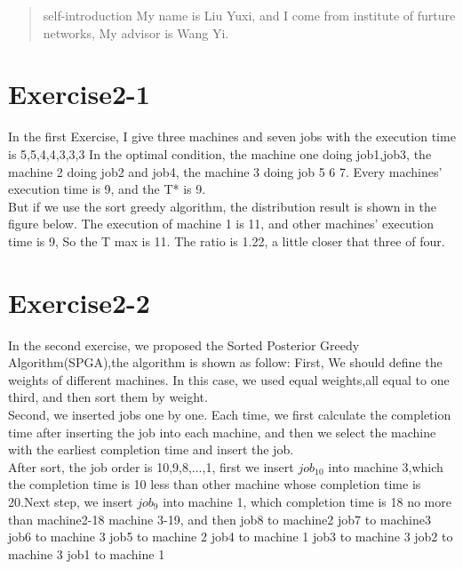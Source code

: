 \documentclass[]{article}
\title{}
\author{}
\begin{document}
\maketitle

\begin{abstract}
self-introduction
My name is Liu Yuxi, and I come from institute of furture networks, My advisor is Wang Yi.
\end{abstract}

\section{Exercise2-1}
In the first Exercise, I give three machines and seven jobs with the execution time is 5,5,4,4,3,3,3
In the optimal condition, the machine one doing job1,job3, the machine 2 doing job2 and job4, the machine 3 doing job 5 6 7. Every machines' execution time is 9, and the T* is 9.\\
But if we use the sort greedy algorithm, the distribution result is shown in the figure below. The execution of machine 1 is 11, and other machines' execution time is 9, So the T max is 11. The ratio is 1.22, a little closer that three of four.
\section{Exercise2-2}
In the second exercise, we proposed the Sorted Posterior Greedy Algorithm(SPGA),the algorithm is shown as follow:
First, We should define the weights of different machines. In this case, we used equal weights,all equal to one third, and then sort them by weight.\\
Second, we inserted jobs one by one. Each time, we first calculate the completion time after inserting the job into each machine, and then we select the machine with the earliest completion time and insert the job.\\
After sort, the job order is 10,9,8,...,1, first we insert $job_{10}$ into machine 3,which the completion time is 10 less than other machine whose completion time is 20.Next step, we insert $job_9$ into machine 1, which completion time is 18 no more than machine2-18 machine 3-19,
and then job8 to machine2
job7 to machine3
job6 to machine 3
job5 to machine 2
job4 to machine 1
job3 to machine 3
job2 to machine 3
job1 to machine 1
\end{document}
